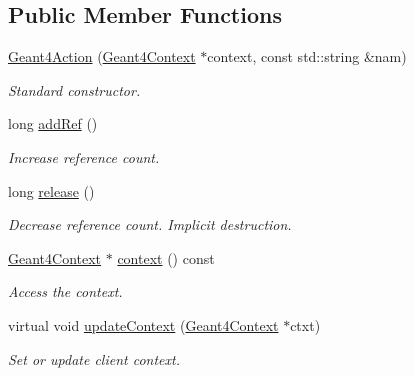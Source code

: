 \subsection*{Public Member Functions}
\begin{DoxyCompactItemize}
\item 
\hyperlink{class_d_d4hep_1_1_simulation_1_1_geant4_action_aa4751aea8e811093f9c88aa2016f16b3}{Geant4Action} (\hyperlink{class_d_d4hep_1_1_simulation_1_1_geant4_context}{Geant4Context} $\ast$context, const std::string \&nam)
\begin{DoxyCompactList}\small\item\em Standard constructor. \item\end{DoxyCompactList}\item 
long \hyperlink{class_d_d4hep_1_1_simulation_1_1_geant4_action_abf90df73db256488940810101fd63a8a}{addRef} ()
\begin{DoxyCompactList}\small\item\em Increase reference count. \item\end{DoxyCompactList}\item 
long \hyperlink{class_d_d4hep_1_1_simulation_1_1_geant4_action_a3afba3ee937fdbd25d27994e4e75c5ac}{release} ()
\begin{DoxyCompactList}\small\item\em Decrease reference count. Implicit destruction. \item\end{DoxyCompactList}\item 
\hyperlink{class_d_d4hep_1_1_simulation_1_1_geant4_context}{Geant4Context} $\ast$ \hyperlink{class_d_d4hep_1_1_simulation_1_1_geant4_action_ae695d6fe735edceeea30e84afd329e38}{context} () const 
\begin{DoxyCompactList}\small\item\em Access the context. \item\end{DoxyCompactList}\item 
virtual void \hyperlink{class_d_d4hep_1_1_simulation_1_1_geant4_action_ae3b9daf2af881df956c46568c0743313}{updateContext} (\hyperlink{class_d_d4hep_1_1_simulation_1_1_geant4_context}{Geant4Context} $\ast$ctxt)
\begin{DoxyCompactList}\small\item\em Set or update client context. \item\end{DoxyCompactList}\item 

\end{DoxyCompactItemize}
